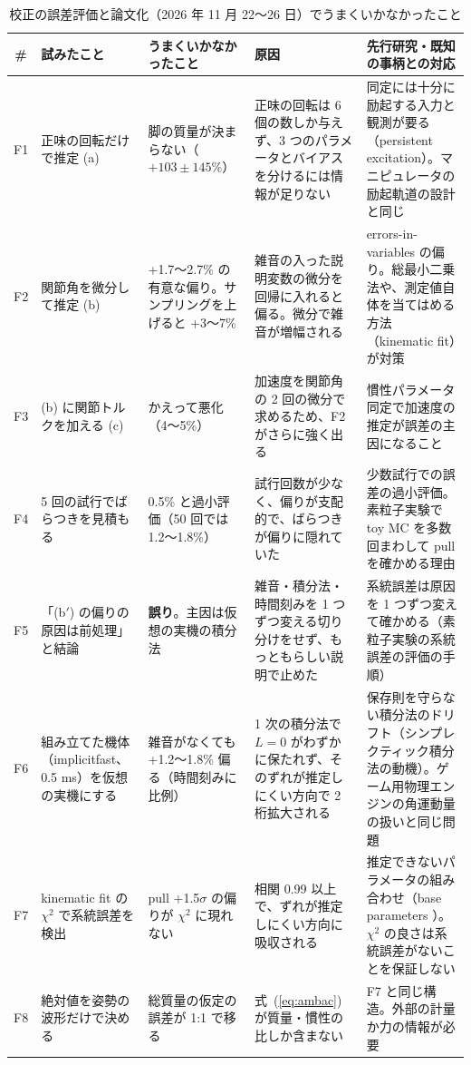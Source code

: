 \documentclass[paper=a4paper,fontsize=10pt,twocolumn,column_gap=2zw,line_length=24zw,number_of_lines=46,head_space=20mm]{jlreq}
\begin{document}
\begin{table}[t]\centering\footnotesize
\caption{校正の誤差評価と論文化（2026 年 11 月 22〜26 日）でうまくいかなかったこと}\label{tab:fail}
\setlength{\tabcolsep}{3pt}
\begin{tabular}{cp{}p{}p{}p{}}\toprule
\# & 試みたこと & うまくいかなかったこと & 原因 & 先行研究・既知の事柄との対応 \\\midrule
F1 & 正味の回転だけで推定 (a) & 脚の質量が決まらない（$+103\pm145\%$） & 正味の回転は 6 個の数しか与えず、3 つのパラメータとバイアスを分けるには情報が足りない & 同定には十分に励起する入力と観測が要る（persistent excitation）。マニピュレータの励起軌道の設計と同じ \\
F2 & 関節角を微分して推定 (b) & +1.7〜2.7\% の有意な偏り。サンプリングを上げると +3〜7\% & 雑音の入った説明変数の微分を回帰に入れると偏る。微分で雑音が増幅される & errors-in-variables の偏り。総最小二乗法や、測定値自体を当てはめる方法（kinematic fit）が対策 \\
F3 & (b) に関節トルクを加える (c) & かえって悪化（4〜5\%） & 加速度を関節角の 2 回の微分で求めるため、F2 がさらに強く出る & 慣性パラメータ同定で加速度の推定が誤差の主因になること \cite{atkeson1986} \\
F4 & 5 回の試行でばらつきを見積もる & 0.5\% と過小評価（50 回では 1.2〜1.8\%） & 試行回数が少なく、偏りが支配的で、ばらつきが偏りに隠れていた & 少数試行での誤差の過小評価。素粒子実験で toy MC を多数回まわして pull を確かめる理由 \\
F5 & 「(b$'$) の偏りの原因は前処理」と結論 & \textbf{誤り}。主因は仮想の実機の積分法 & 雑音・積分法・時間刻みを 1 つずつ変える切り分けをせず、もっともらしい説明で止めた & 系統誤差は原因を 1 つずつ変えて確かめる（素粒子実験の系統誤差の評価の手順） \\
F6 & 組み立てた機体（implicitfast、0.5 ms）を仮想の実機にする & 雑音がなくても +1.2〜1.8\% 偏る（時間刻みに比例） & 1 次の積分法で $L=0$ がわずかに保たれず、そのずれが推定しにくい方向で 2 桁拡大される & 保存則を守らない積分法のドリフト（シンプレクティック積分法の動機）。ゲーム用物理エンジンの角運動量の扱いと同じ問題 \\
F7 & kinematic fit の $\chi^2$ で系統誤差を検出 & pull +1.5$\sigma$ の偏りが $\chi^2$ に現れない & 相関 0.99 以上で、ずれが推定しにくい方向に吸収される & 推定できないパラメータの組み合わせ（base parameters \cite{gautier1990}）。$\chi^2$ の良さは系統誤差がないことを保証しない \\
F8 & 絶対値を姿勢の波形だけで決める & 総質量の仮定の誤差が 1:1 で移る & 式~(\ref{eq:ambac}) が質量・慣性の比しか含まない & F7 と同じ構造。外部の計量か力の情報が必要 \\

\end{tabular}
\end{table}
\end{document}
